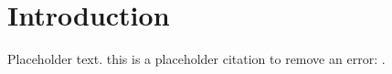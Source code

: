 \section{Introduction}
Placeholder text. this is a placeholder citation to remove an error: \cite{breivik2017mpc}.

\newpage